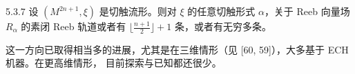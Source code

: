 \begin{wconj}{5.3.7}
  设 $(M^{2n+1},\xi)$ 是切触流形。则对 $\xi$ 的任意切触形式 $\alpha$，关于 Reeb 向量场
  $R_\alpha$ 的素闭 Reeb 轨道或者有 $\bigl\lfloor\frac{n+1}{2}\bigr\rfloor+1$ 条，或者有无穷多条。
\end{wconj}

这一方向已取得相当多的进展，尤其是在三维情形（见 [60, 59]），大多基于 ECH 机器。在更高维情形，
目前探索与已知都还很少。
